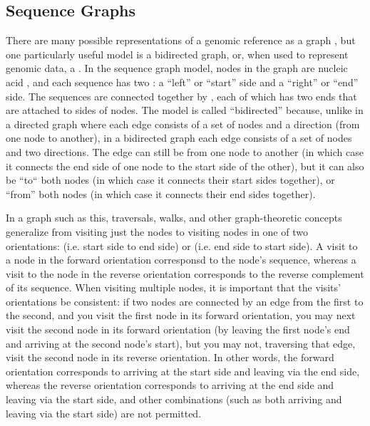 

\subsection{Sequence Graphs}

There are many possible representations of a genomic reference as a graph \cite{computational2016computational}, but one particularly useful model is a bidirected graph, or, when used to represent genomic data, a  \cite{paten2017genome}. In the sequence graph model, nodes in the graph are nucleic acid , and each sequence has two : a ``left'' or ``start'' side and a ``right'' or ``end'' side. The sequences are connected together by , each of which has two ends that are attached to sides of nodes. The model is called ``bidirected'' because, unlike in a directed graph where each edge consists of a set of nodes and a direction (from one node to another), in a bidirected graph each edge consists of a set of nodes and two directions. The edge can still be from one node to another (in which case it connects the end side of one node to the start side of the other), but it can also be ``to`` both nodes (in which case it connects their start sides together), or ``from'' both nodes (in which case it connects their end sides together).

In a graph such as this, traversals, walks, and other graph-theoretic concepts generalize from visiting just the nodes to visiting nodes in one of two orientations:  (i.e. start side to end side) or  (i.e. end side to start side). A visit to a node in the forward orientation corresponsd to the node's sequence, whereas a visit to the node in the reverse orientation corresponds to the reverse complement of its sequence. When visiting multiple nodes, it is important that the visits' orientations be consistent: if two nodes are connected by an edge from the first to the second, and you visit the first node in its forward orientation, you may next visit the second node in its forward orientation (by leaving the first node's end and arriving at the second node's start), but you may not, traversing that edge, visit the second node in its reverse orientation. In other words, the forward orientation corresponds to arriving at the start side and leaving via the end side, whereas the reverse orientation corresponds to arriving at the end side and leaving via the start side, and other combinations (such as both arriving and leaving via the start side) are not permitted.

